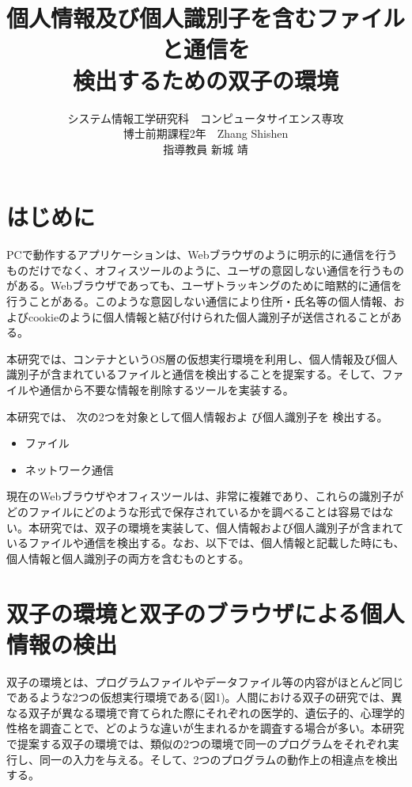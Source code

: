 \documentclass[a4paper,twocolumn,10pt]{jarticle}
\title{\vspace{-1cm}個人情報及び個人識別子を含むファイルと通信を\\検出するための双子の環境}
\author{システム情報工学研究科　コンピュータサイエンス専攻\\博士前期課程2年　Zhang Shishen\\指導教員  新城 靖\\}
\date{}
\begin{document}
\maketitle

\pagestyle{plain}


\section{はじめに}
PCで動作するアプリケーションは、Webブラウザのように明示的に通信を行うものだけでなく、オフィスツールのように、ユーザの意図しない通信を行うものがある。Webブラウザであっても、ユーザトラッキングのために暗黙的に通信を行うことがある。このような意図しない通信により住所・氏名等の個人情報、およびcookieのように個人情報と結び付けられた個人識別子が送信されることがある。

本研究では、コンテナというOS層の仮想実行環境を利用し、個人情報及び個人識別子が含まれているファイルと通信を検出することを提案する\cite{web}。そして、ファイルや通信から不要な情報を削除するツールを実装する。

本研究では、 次の2つを対象として個人情報およ び個人識別子を 検出する。
\begin{itemize}
\item{ファイル}
\item{ネットワーク通信}
\end{itemize}

現在のWebブラウザやオフィスツールは、非常に複雑であり、これらの識別子がどのファイルにどのような形式で保存されているかを調べることは容易ではない。本研究では、双子の環境を実装して、個人情報および個人識別子が含まれているファイルや通信を検出する。なお、以下では、個人情報と記載した時にも、個人情報と個人識別子の両方を含むものとする。


\section{双子の環境と双子のブラウザによる個人情報の検出}

双子の環境とは、プログラムファイルやデータファイル等の内容がほとんど同じであるような2つの仮想実行環境である(図1)。人間における双子の研究では、異なる双子が異なる環境で育てられた際にそれぞれの医学的、遺伝子的、心理学的性格を調査ことで、どのような違いが生まれるかを調査する場合が多い。本研究で提案する双子の環境では、類似の2つの環境で同一のプログラムをそれぞれ実行し、同一の入力を与える。そして、2つのプログラムの動作上の相違点を検出する。
\end{document}
